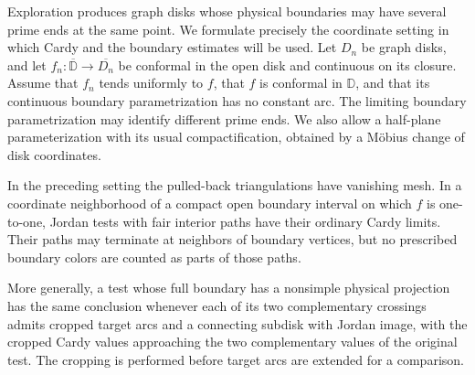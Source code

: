 Exploration produces graph disks whose physical boundaries may
have several prime ends at the same point.  We formulate precisely
the coordinate setting in which Cardy and the boundary estimates
will be used.  Let $D_n$ be graph disks, and let
$f_n:\overline{\mathbb D}\to\overline{D_n}$ be conformal in the
open disk and continuous on its closure.  Assume that $f_n$ tends
uniformly to $f$, that $f$ is conformal in $\mathbb D$, and that
its continuous boundary parametrization has no constant arc.
The limiting boundary parametrization may identify different
prime ends.  We also allow a half-plane parameterization with its
usual compactification, obtained by a M\"obius change of disk
coordinates.

\begin{lemma}\label{lem:chart-cardy}
In the preceding setting the pulled-back triangulations have
vanishing mesh.  In a coordinate neighborhood of a compact open
boundary interval on which $f$ is one-to-one, Jordan tests with
fair interior paths have their ordinary Cardy limits.  Their
paths may terminate at neighbors of boundary vertices, but no
prescribed boundary colors are counted as parts of those paths.

More generally, a test whose full boundary has a nonsimple
physical projection has the same conclusion whenever each of
its two complementary crossings admits cropped target arcs
and a connecting subdisk with Jordan image, with the cropped
Cardy values approaching the two complementary values of the
original test.  The cropping is performed before target arcs
are extended for a comparison.
\end{lemma}


